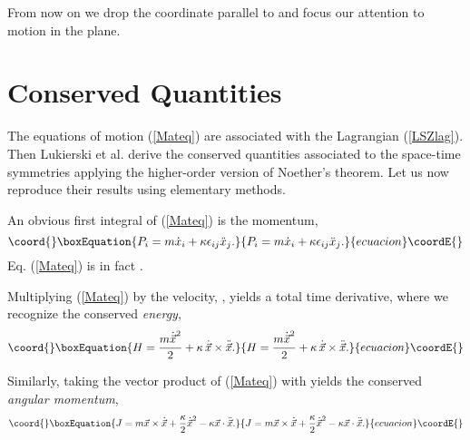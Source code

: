 \documentclass[a4paper,11pt]{article}
\let\ssection=\section
\renewcommand{\section}{\setcounter{equation}{0}\ssection}
\providecommand{\vx}{{\vec x}}
\def\vS{\vec{S}}
\def\vx{{\vec x}}
\begin{document}
 From now on we drop the coordinate parallel to
\myHighlight{$\vS$}\coordHE{} and focus our attention to motion in the plane.


\section{Conserved Quantities}


The equations of motion (\ref{Mateq}) are associated with
the Lagrangian (\ref{LSZlag}).
Then Lukierski et al. derive the conserved quantities
associated to the space-time symmetries
applying the higher-order version of Noether's theorem.
Let us now reproduce their results using elementary methods.

\myHighlight{$\bullet$}\coordHE{}
An obvious first integral of (\ref{Mateq}) is the momentum,
\begin{equation}\coord{}\boxEquation{
     P_{i}=m\dot{x}_{i}+\kappa\epsilon_{ij}\ddot{x}_{j}.
     \label{momentum}
}{
     P_{i}=m\dot{x}_{i}+\kappa\epsilon_{ij}\ddot{x}_{j}.
     }{ecuacion}\coordE{}\end{equation}
Eq. (\ref{Mateq}) is in fact \coordHE{}.

\myHighlight{$\bullet$}\coordHE{} Multiplying (\ref{Mateq}) by the velocity,
\myHighlight{$\dot{\vx}$}\coordHE{}, yields a total time derivative, where we recognize the
conserved {\it energy},
\begin{equation}\coord{}\boxEquation{
     H=\frac{m\dot{\vx}\strut^2}{2}+\kappa\,\dot{\vx}\times\ddot{\vx}.
     \label{energy}
}{
     H=\frac{m\dot{\vx}\strut^2}{2}+\kappa\,\dot{\vx}\times\ddot{\vx}.
     }{ecuacion}\coordE{}\end{equation}

\myHighlight{$\bullet$}\coordHE{} Similarly, taking the vector product of
(\ref{Mateq}) with \myHighlight{$\vx$}\coordHE{} yields the conserved {\it angular momentum},
\begin{equation}\coord{}\boxEquation{
     J=m\vx\times\dot{\vx}+\frac{\kappa}{2}\dot{\vx}\strut^2
     -\kappa\vx\cdot\ddot{\vx}.
     \label{angmom}
}{
     J=m\vx\times\dot{\vx}+\frac{\kappa}{2}\dot{\vx}\strut^2
     -\kappa\vx\cdot\ddot{\vx}.
     }{ecuacion}\coordE{}\end{equation}
\end{document}
